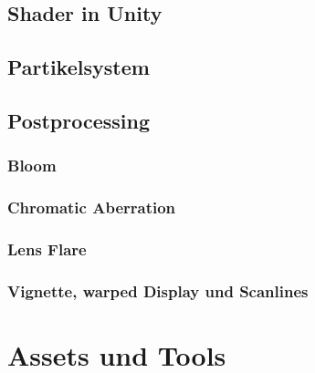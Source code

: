 \documentclass[a4paper,10pt,ngerman,fontsize=12pt]{scrreprt}
\begin{document}
\section{Shader in Unity}

\lipsum[3]



\section{Partikelsystem}

\lipsum[3]



\section{Postprocessing}

\lipsum[3]



\subsection{Bloom}
\lipsum[3]



\subsection{Chromatic Aberration}

\lipsum[3]



\subsection{Lens Flare}

\lipsum[3]



\subsection{Vignette, warped Display und Scanlines}

\lipsum[3]





\chapter{Assets und Tools}
\end{document}
